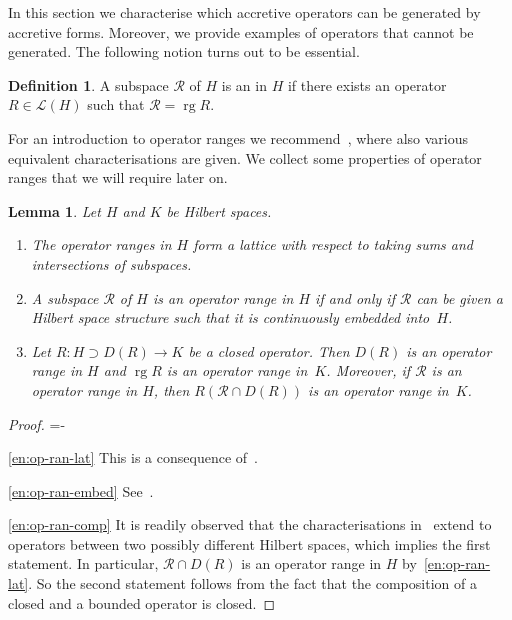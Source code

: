 \documentclass[a4paper,oneside,12pt]{amsart}
\makeatletter
\theoremstyle{plain}
\newtheorem{lemma}[theorem]{Lemma}
\theoremstyle{definition}
\newtheorem{definition}[theorem]{Definition}
\newenvironment{parenum}[1][]{\my@savedparindent=\parindent\ifthenelse{\equal{#1}{}}{\asparaenum}{\asparaenum[#1]}\advance\itemindent-\my@savedparindent
\patchcmd{\@item}{\ignorespaces}{{\itemindent={\the\itemindent}
\def{}}\ignorespaces}{}{}}
{\endasparaenum}
\makeatother
\begin{document}
In this section we characterise which accretive operators can be generated by accretive forms.
Moreover, we provide examples of operators that cannot be generated.
The following notion turns out to be essential.
\begin{definition}
A subspace $\mathcal{R}$ of $H$ is an {\textbf{\unboldmath}} in $H$ if there exists an operator $R\in{\mathcal{L}}(H)$ such
that $\mathcal{R} = \operatorname{rg} R$.
\end{definition}
For an introduction to operator ranges we recommend~\cite{FW71:op-rg},
where also various equivalent characterisations are given. 
We collect some properties of operator ranges that we will require later on.
\begin{lemma}\label{lem:op-ran}
Let $H$ and $K$ be Hilbert spaces.
\begin{enumerate}[\upshape (a)]
\item\label{en:op-ran-lat}
The operator ranges in $H$
form a lattice with respect to taking sums and intersections of subspaces.
\item\label{en:op-ran-embed}
A subspace $\mathcal{R}$ of $H$ is an operator range in $H$ if and only if $\mathcal{R}$ can be
given a Hilbert space structure such that it is continuously embedded into~$H$.
\item\label{en:op-ran-comp}
Let $R\colon H\supset D(R)\to K$ be a closed operator.
Then $D(R)$ is an operator range in $H$ and
$\operatorname{rg} R$ is an operator range in~$K$.
Moreover, if $\mathcal{R}$ is an operator range in $H$, then $R(\mathcal{R}\cap D(R))$
is an operator range in~$K$.
\end{enumerate}
\end{lemma}
\begin{proof}
\begin{parenum}
\item[\ref{en:op-ran-lat}] This is a consequence of~\cite[Theorem~2.2 and the following Corollary 2]{FW71:op-rg}.
\item[\ref{en:op-ran-embed}] See~\cite[Theorem~1.1]{FW71:op-rg}. 
\item[\ref{en:op-ran-comp}]
It is readily observed that the characterisations in~\cite[Theorem~1.1]{FW71:op-rg} extend to 
operators between two possibly different Hilbert spaces, which implies the first statement.
In particular, $\mathcal{R}\cap D(R)$ is an operator range in $H$ by~\ref{en:op-ran-lat}.
So the second statement follows from the fact that the composition
of a closed and a bounded operator is closed.\qedhere
\end{parenum}
\end{proof}
\end{document}
